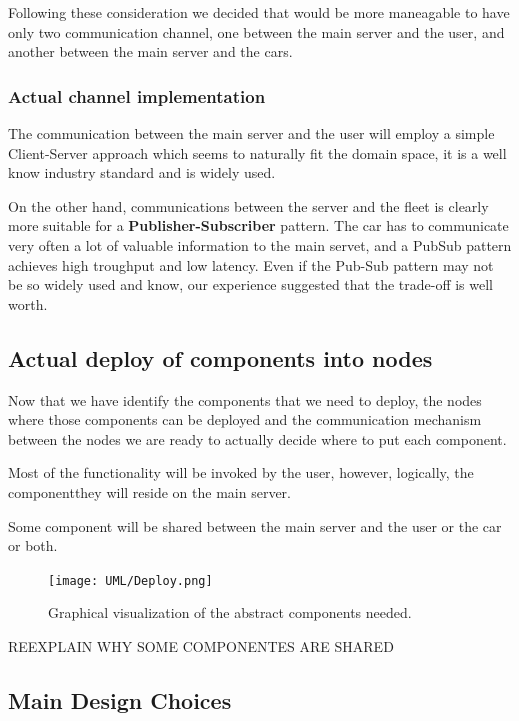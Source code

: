 \documentclass[11pt]{article} %
\begin{document}
Following these consideration we decided that would be more maneagable to have only two communication channel, one between the main server and the user, and another between the main server and the cars. 

\subsubsection{Actual channel implementation}

The communication between the main server and the user will employ a simple Client-Server approach which seems to naturally fit the domain space, it is a well know industry standard and is widely used.

On the other hand, communications between the server and the fleet is clearly more suitable for a \textbf{Publisher-Subscriber} pattern. The car has to communicate very often a lot of valuable information to the main servet, and a PubSub pattern achieves high troughput and low latency. Even if the Pub-Sub pattern may not be so widely used and know, our experience suggested that the trade-off is well worth.

\subsection{Actual deploy of components into nodes}

Now that we have identify the components that we need to deploy, the nodes where those components can be deployed and the communication mechanism between the nodes we are ready to actually decide where to put each component.

Most of the functionality will be invoked by the user, however, logically, the componentthey will reside on the main server.

Some component will be shared between the main server and the user or the car or both.


\begin{figure}[H]
	\centering
	\texttt{[image: UML/Deploy.png]}
	\caption{Graphical visualization of the abstract components needed.}
\end{figure}	


REEXPLAIN WHY SOME COMPONENTES ARE SHARED






\subsection{Main Design Choices}
\end{document}
